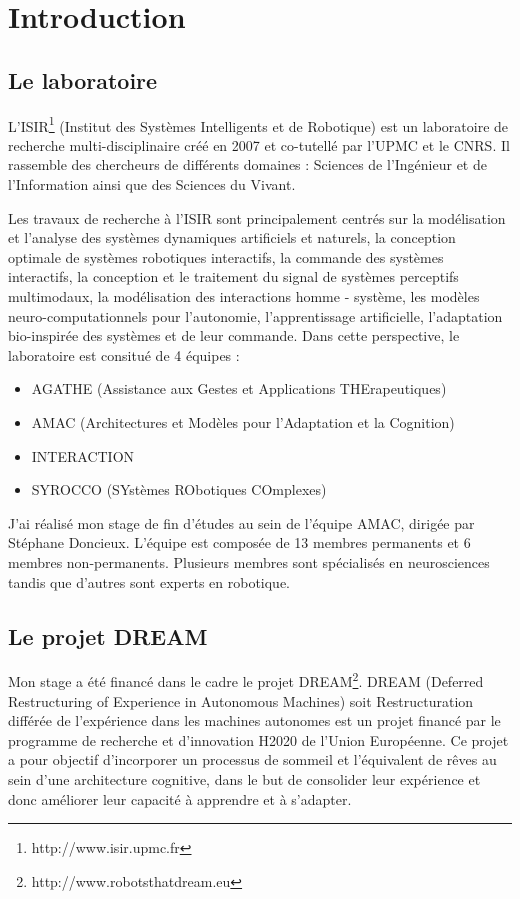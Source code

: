 \documentclass{llncs}
\begin{document}




\section{Introduction}


\subsection{Le laboratoire}

L'ISIR\footnote{http://www.isir.upmc.fr} (Institut des Systèmes Intelligents et de Robotique) est un laboratoire de recherche multi-disciplinaire créé en 2007 et co-tutellé par l'UPMC et le CNRS. Il rassemble des chercheurs de différents domaines : Sciences de l’Ingénieur et de l’Information ainsi que des Sciences du Vivant.

Les travaux de recherche à l'ISIR sont principalement centrés sur la modélisation et l'analyse des systèmes dynamiques artificiels et naturels, la conception optimale de systèmes robotiques interactifs, la commande des systèmes interactifs, la conception et le traitement du signal de systèmes perceptifs multimodaux, la modélisation des interactions homme - système, les modèles neuro-computationnels pour l’autonomie, l'apprentissage artificielle, l'adaptation bio-inspirée des systèmes et de leur commande. Dans cette perspective, le laboratoire est consitué de 4 équipes :
\begin{itemize}
\item AGATHE (Assistance aux Gestes et Applications THErapeutiques)
\item AMAC (Architectures et Modèles pour l'Adaptation et la Cognition)
\item INTERACTION
\item SYROCCO (SYstèmes RObotiques COmplexes)
\end{itemize}

J'ai réalisé mon stage de fin d'études au sein de l'équipe AMAC, dirigée par Stéphane Doncieux. L'équipe est composée de 13 membres permanents et 6 membres non-permanents. Plusieurs membres sont spécialisés en neurosciences tandis que d'autres sont experts en robotique.




\subsection{Le projet DREAM}
Mon stage a été financé dans le cadre le projet DREAM\footnote{http://www.robotsthatdream.eu}. DREAM (Deferred Restructuring of Experience in Autonomous Machines) soit Restructuration différée de l'expérience dans les machines autonomes est un projet financé par le programme de recherche et d'innovation H2020 de l'Union Européenne. Ce projet a pour objectif d'incorporer un processus de sommeil et l'équivalent de rêves au sein d'une architecture cognitive, dans le but de consolider leur expérience et donc améliorer leur capacité à apprendre et à s'adapter.
\end{document}
